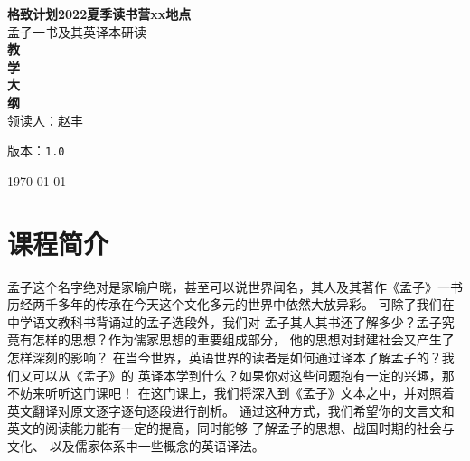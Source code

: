 \documentclass[12pt]{ctexart}
\def\version{1.0}
\newenvironment{smaller}{\zihao{5}}{\zihao{-4}}
\begin{document}
\begin{titlepage}
\begin{center}
    \vspace{-0.5in}
    \textmd{\textbf{\huge{格致计划2022夏季读书营xx地点}}}\\
    \normalsize\vspace{0.1in}\Large{孟子一书及其英译本研读}\\
    \vspace{0.8in}
     \textbf{\huge{教}}\\
    \vspace{0.8in}
     \textbf{\huge{学}}\\
    \vspace{0.8in}
     \textbf{\huge{大}}\\
    \vspace{0.8in}
    \textbf{\huge{纲}}\\
    \vspace{0.8in}
    领读人：赵丰
\vspace{0.2in}
\begin{smaller}

版本：\texttt{\version}

\today
\end{smaller}
\end{center}
\end{titlepage}
\thispagestyle{empty}
\pagebreak
\pagestyle{runningpage}

\section{课程简介}
孟子这个名字绝对是家喻户晓，甚至可以说世界闻名，其人及其著作《孟子》一书
历经两千多年的传承在今天这个文化多元的世界中依然大放异彩。
可除了我们在中学语文教科书背诵过的孟子选段外，我们对
孟子其人其书还了解多少？孟子究竟有怎样的思想？作为儒家思想的重要组成部分，
他的思想对封建社会又产生了怎样深刻的影响？
在当今世界，英语世界的读者是如何通过译本了解孟子的？我们又可以从《孟子》的
英译本学到什么？如果你对这些问题抱有一定的兴趣，那不妨来听听这门课吧！
在这门课上，我们将深入到《孟子》文本之中，并对照着英文翻译对原文逐字逐句逐段进行剖析。
通过这种方式，我们希望你的文言文和英文的阅读能力能有一定的提高，同时能够
了解孟子的思想、战国时期的社会与文化、
以及儒家体系中一些概念的英语译法。
\end{document}
